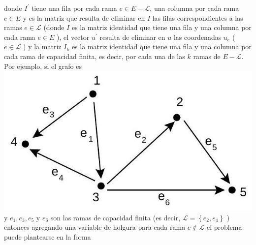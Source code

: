 \documentclass[10pt]{article}
\begin{document}
donde $I^{\prime}$ tiene una fila por cada rama $e \in E-\mathcal{L}$, una columna por cada rama $e \in E$ y es la matriz que resulta de eliminar en $I$ las filas correspondientes a las ramas $e \in \mathcal{L}$ (donde $I$ es la matriz identidad que tiene una fila y una columna por cada rama $e \in E$ ), el vector $u^{\prime}$ resulta de eliminar en $u$ las coordenadas $u_{e}$ ( $e \in \mathcal{L}$ ) y la matriz $I_{k}$ es la matriz identidad que tiene una fila y una columna por cada rama de capacidad finita, es decir, por cada una de las $k$ ramas de $E-\mathcal{L}$.\\
Por ejemplo, si el grafo es\\
\includegraphics[max width=\textwidth, center]{2025_09_05_955b52bfc43174a24a9ag-09}\\
y $e_{1}, e_{3}, e_{5}$ y $e_{6}$ son las ramas de capacidad finita (es decir, $\mathcal{L}=\left\{e_{2}, e_{4}\right\}$ ) entonces agregando una variable de holgura para cada rama $e \notin \mathcal{L}$ el problema puede plantearse en la forma
\end{document}

